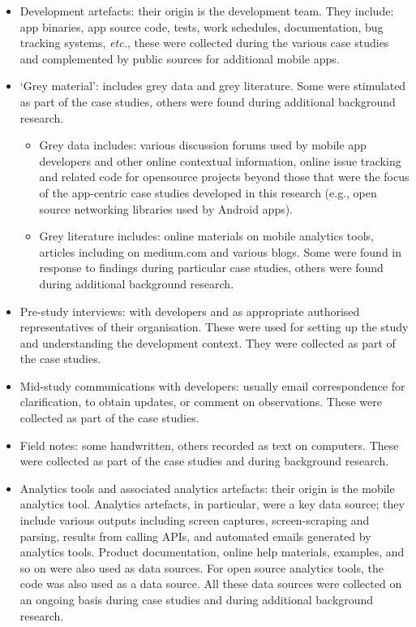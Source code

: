 \begin{itemize}
    \itemsep0em
    \item Development artefacts: their origin is the development team. They include: app binaries, app source code, tests, work schedules, documentation, bug tracking systems, \textit{etc.}, these were collected during the various case studies and complemented by public sources for additional mobile apps. 
    \item `Grey material': includes grey data and grey literature. Some were stimulated as part of the case studies, others were found during additional background research.
    \begin{itemize}
                \item Grey data includes: various discussion forums used by mobile app developers and other online contextual information, online issue tracking and related code for opensource projects beyond those that were the focus of the app-centric case studies developed in this research (e.g., open source networking libraries used by Android apps). 
                \item Grey literature includes: online materials on mobile analytics tools, articles including on medium.com and various blogs. Some were found in response to findings during particular case studies, others were found during additional background research.
    \end{itemize}
    \item Pre-study interviews: with developers and as appropriate authorised representatives of their organisation. These were used for setting up the study and understanding the development context. They were collected as part of the case studies.
    \item Mid-study communications with developers: usually email correspondence for clarification, to obtain updates, or comment on observations. These were collected as part of the case studies.
    \item Field notes: some handwritten, others recorded as text on computers. These were collected as part of the case studies and during background research.
    \item Analytics tools and associated analytics artefacts: their origin is the mobile analytics tool. Analytics artefacts, in particular, were a key data source; they include various outputs including screen captures, screen-scraping and parsing, results from calling APIs, and automated emails generated by analytics tools. Product documentation, online help materials, examples, and so on were also used as data sources. For open source analytics tools, the code was also used as a data source. All these data sources were collected on an ongoing basis during case studies and during additional background research.
\end{itemize}

